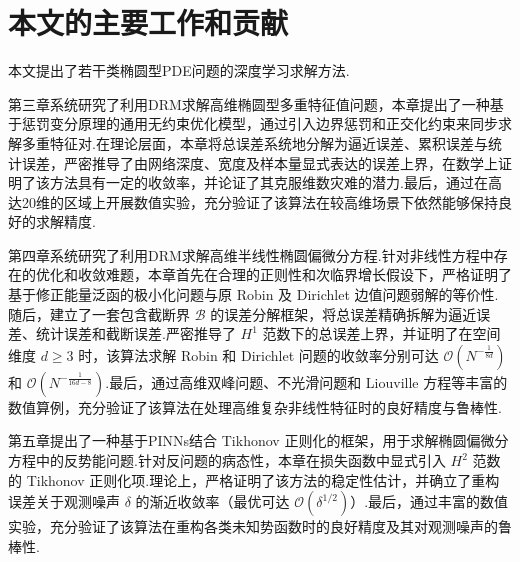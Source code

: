 \section{本文的主要工作和贡献}
本文提出了若干类椭圆型PDE问题的深度学习求解方法.

第三章系统研究了利用DRM求解高维椭圆型多重特征值问题，本章提出了一种基于惩罚变分原理的通用无约束优化模型，通过引入边界惩罚和正交化约束来同步求解多重特征对.在理论层面，本章将总误差系统地分解为逼近误差、累积误差与统计误差，严密推导了由网络深度、宽度及样本量显式表达的误差上界，在数学上证明了该方法具有一定的收敛率，并论证了其克服维数灾难的潜力.最后，通过在高达20维的区域上开展数值实验，充分验证了该算法在较高维场景下依然能够保持良好的求解精度.

第四章系统研究了利用DRM求解高维半线性椭圆偏微分方程.针对非线性方程中存在的优化和收敛难题，本章首先在合理的正则性和次临界增长假设下，严格证明了基于修正能量泛函的极小化问题与原 Robin 及 Dirichlet 边值问题弱解的等价性.随后，建立了一套包含截断界 $\mathcal{B}$ 的误差分解框架，将总误差精确拆解为逼近误差、统计误差和截断误差.严密推导了 $H^1$ 范数下的总误差上界，并证明了在空间维度 $d \ge 3$ 时，该算法求解 Robin 和 Dirichlet 问题的收敛率分别可达 $\mathcal{O}(N^{-\frac{1}{8d}})$ 和 $\mathcal{O}(N^{-\frac{1}{16d-8}})$.最后，通过高维双峰问题、不光滑问题和 Liouville 方程等丰富的数值算例，充分验证了该算法在处理高维复杂非线性特征时的良好精度与鲁棒性.

第五章提出了一种基于PINNs结合 Tikhonov 正则化的框架，用于求解椭圆偏微分方程中的反势能问题.针对反问题的病态性，本章在损失函数中显式引入 $H^2$ 范数的 Tikhonov 正则化项.理论上，严格证明了该方法的稳定性估计，并确立了重构误差关于观测噪声 $\delta$ 的渐近收敛率（最优可达 $\mathcal{O}(\delta^{1/2})$）.最后，通过丰富的数值实验，充分验证了该算法在重构各类未知势函数时的良好精度及其对观测噪声的鲁棒性.

